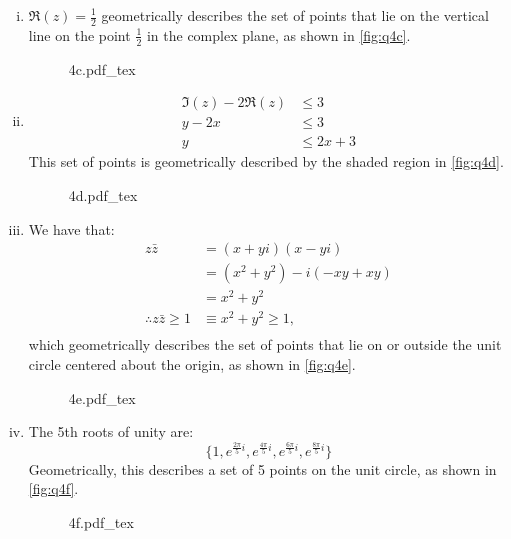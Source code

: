 \documentclass[a4paper, titlepage, DIV=14]{scrartcl}
\newcommand{\incfig}[1]{%
    \def\svgwidth{0.45\columnwidth}
    {#1.pdf_tex}
}
\begin{document}
\begin{enumerate}
\begin{enumerate}[i)]
            \item 
            $\Re(z) = \frac{1}{2}$ geometrically describes the set of points that lie on
            the vertical line on the point $\frac{1}{2}$ in the complex plane, as shown in 
            \autoref{fig:q4c}. \\
            \begin{figure}[!h]
                \centering
                \incfig{4c}
                \caption{}
                \label{fig:q4c}
            \end{figure}

            \item 
            \begin{align*}
                \Im(z) - 2\Re(z) &\leq 3 \\
                y - 2x &\leq 3 \\
                y &\leq 2x + 3
            \end{align*}
            This set of points is geometrically described by the shaded region in
            \autoref{fig:q4d}. \\
            \begin{figure}[!h]
                \centering
                \incfig{4d}
                \caption{}
                \label{fig:q4d}
            \end{figure}

            \item 
            We have that:
            \begin{align*}
                z\bar{z} &= (x+yi)(x-yi) \\
                    &= (x^{2}+y^{2})-i(-xy+xy) \\
                    &= x^{2}+y^{2} \\
            \therefore z\bar{z} \geq 1 &\equiv x^{2}+y^{2} \geq 1, \\
            \end{align*} which geometrically describes the set of points that lie
            on or outside the unit circle centered about the origin, as shown in 
            \autoref{fig:q4e}.
            \begin{figure}[!h]
                \centering
                \incfig{4e}
                \caption{}
                \label{fig:q4e}
            \end{figure}

            \item The 5th roots of unity are:
            \begin{equation*}
                \{1, e^{\frac{2\pi}{5}i}, e^{\frac{4\pi}{5}i}, 
                e^{\frac{6\pi}{5}i}, e^{\frac{8\pi}{5}i} \}
            \end{equation*} Geometrically, this describes a set of 5 points on the unit
            circle, as shown in \autoref{fig:q4f}.\\
            \begin{figure}[!h]
                \centering
                \incfig{4f}
                \caption{}
                \label{fig:q4f}
            \end{figure}
        \end{enumerate}
        

\end{enumerate}
\end{document}
